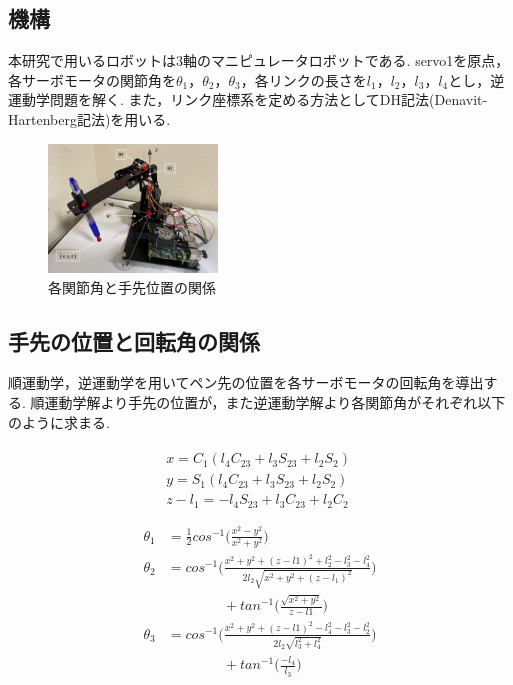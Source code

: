 \documentclass[10pt]{jarticle}
\begin{document}
	\subsection{機構}
	本研究で用いるロボットは3軸のマニピュレータロボットである.
	servo1を原点，各サーボモータの関節角を$\theta_1，\theta_2，\theta_3$，各リンクの長さを$l_1，l_2，l_3，l_4$とし，逆運動学問題を解く.
	また，リンク座標系を定める方法としてDH記法(Denavit-Hartenberg記法)を用いる.
    \begin{center}
        \begin{figure}[h]
            \includegraphics[width=0.40\textwidth]{img/002.png}
            \caption{各関節角と手先位置の関係}
            \label{manipulator}
        \end{figure}
    \end{center}
	\subsection{手先の位置と回転角の関係}
	順運動学，逆運動学を用いてペン先の位置を各サーボモータの回転角を導出する.
	順運動学解より手先の位置が，また逆運動学解より各関節角がそれぞれ以下のように求まる.
	
	\scriptsize
	\begin{equation}
		\begin{array}{c}
			\begin{split}
				&  x  =  C_1(l_4C_{23}  +  l_3S_{23}  +  l_2S_2)\quad \\
				&  y  =  S_1(l_4C_{23}  +  l_3S_{23}  +  l_2S_2)\quad \\
				&  z  -  l_1  =  -l_4S_{23}  +  l_3C_{23}  +  l_2C_2\quad \\
			\end{split}
		\end{array}
	\end{equation}
	\begin{equation}
		\begin{array}{c}
			\begin{split}
				\theta_1  &  =\frac{1}{2}  cos^{-1}\biggl( \frac{x^2-y^2}{x^2+y^2} \biggr) \\
				\theta_2  &  = cos^{-1}\biggl( \frac{x^2+y^2+(z-l1)^2  +  l_2^2-l_3^2-l_4^2}{2l_2\sqrt{x^2+y^2+(z-l_1)^2}} \biggr)\\
				&\qquad\qquad  +  tan^{-1}\biggl( \frac{\sqrt{x^2+y^2}}{z-l1}\biggr) \\
				\theta_3  &  =cos^{-1}\biggl( \frac{x^2+y^2+(z-l1)^2 - l_4^2-l_3^2-l_2^2}{2l_2\sqrt{l_3^2+l_4^2}}\biggr)\\
				&\qquad\qquad + tan^{-1}\biggl( \frac{-l_4}{l_3}\biggr)\\
			\end{split}
		\end{array}
	\end{equation}
	\normalsize
\end{document}
